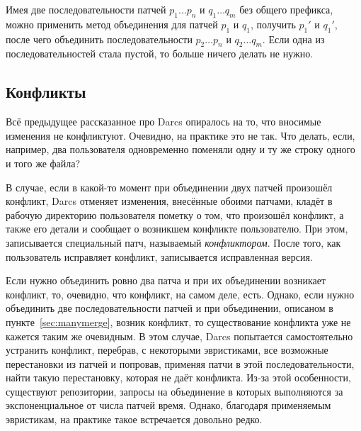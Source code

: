 Имея две последовательности патчей $p_1\ldots p_n$ и $q_1\ldots q_m$
без общего префикса, можно применить метод объединения для патчей
$p_1$ и $q_1$, получить $p_1'$ и $q_1'$, после чего объединить
последовательности $p_2\ldots p_n$ и $q_2\ldots q_m$. Если одна из
последовательностей стала пустой, то больше ничего делать не нужно.

\subsection{Конфликты}

Всё предыдущее рассказанное про Darcs опиралось на то, что вносимые
изменения не конфликтуют. Очевидно, на практике это не так. Что
делать, если, например, два пользователя одновременно поменяли одну и
ту же строку одного и того же файла?

В случае, если в какой-то момент при объединении двух патчей произошёл
конфликт, Darcs отменяет изменения, внесённые обоими патчами, кладёт в
рабочую директорию пользователя пометку о том, что произошёл конфликт,
а также его детали и сообщает о возникшем конфликте пользователю. При
этом, записывается специальный патч, называемый \emph{конфликтором}.
После того, как пользователь исправляет конфликт, записывается
исправленная версия. 

Если нужно объединить ровно два патча и при их объединении возникает
конфликт, то, очевидно, что конфликт, на самом деле, есть. Однако,
если нужно объединить две последовательности патчей и при объединении,
описаном в пункте~\ref{sec:manymerge}, возник конфликт, то
существование конфликта уже не кажется таким же очевидным. В этом
случае, Darcs попытается самостоятельно устранить конфликт, перебрав,
с некоторыми эвристиками, все возможные перестановки из патчей и
попровав, применяя патчи в этой последовательности, найти такую
перестановку, которая не даёт конфликта. Из-за этой особенности,
существуют репозитории, запросы на объединение в которых выполняются
за экспоненциальное от числа патчей время. Однако, благодаря
применяемым эвристикам, на практике такое встречается довольно редко.
